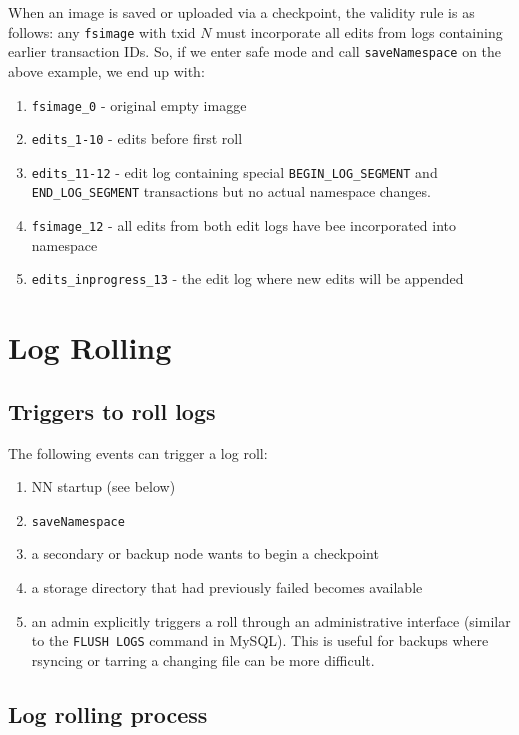\documentclass{article}
\begin{document}
When an image is saved or uploaded via a checkpoint, the validity rule is as follows:
any {\tt fsimage} with txid $N$ must incorporate all edits from logs containing earlier transaction IDs.
So, if we enter safe mode and call {\tt saveNamespace} on the above example, we end up with:
\begin{enumerate}
\item  {\tt fsimage\_0} - original empty imagge
\item  {\tt edits\_1-10} - edits before first roll
\item  {\tt edits\_11-12} - edit log containing special {\tt BEGIN\_LOG\_SEGMENT} and {\tt END\_LOG\_SEGMENT} transactions but no actual namespace changes.
\item  {\tt fsimage\_12} - all edits from both edit logs have bee incorporated into namespace
\item  {\tt edits\_inprogress\_13} - the edit log where new edits will be appended
\end{enumerate}

\section{Log Rolling}

\subsection{Triggers to roll logs}
The following events can trigger a log roll:

\begin{enumerate}
\item NN startup (see below)
\item {\tt saveNamespace}
\item a secondary or backup node wants to begin a checkpoint
\item a storage directory that had previously failed becomes available
\item an admin explicitly triggers a roll through an administrative interface
      (similar to the  {\tt FLUSH LOGS} command in MySQL). This is useful for
      backups where rsyncing or tarring a changing file can be more difficult.
\end{enumerate}

\subsection{Log rolling process}
\end{document}
